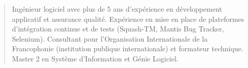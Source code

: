 \documentclass[10pt,a4paper,ragged2e,withhyper]{altacv}
\begin{document}

    
    \makecvheader

    \begin{quote}
    \normalsize Ingénieur logiciel avec plus de 5 ans d'expérience en développement applicatif et assurance qualité. Expérience en mise en place de plateformes d'intégration continue et de tests (Squash-TM, Mantis Bug Tracker, Selenium). Consultant pour l'Organisation Internationale de la Francophonie (institution publique internationale) et formateur technique. Master 2 en Système d'Information et Génie Logiciel.
    \end{quote}
    \vspace{-0.5em}

\end{document}
